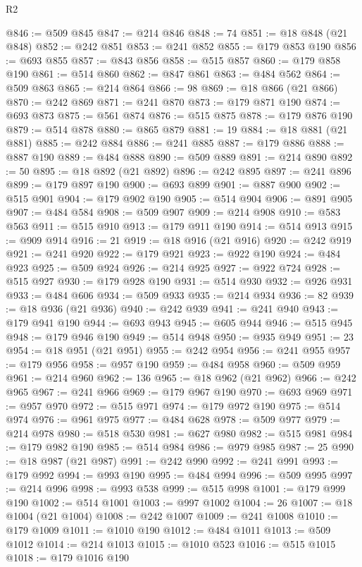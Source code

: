 \begin{lexlean}{R2}
\begin{coremodule}
@846 := @509 @845
@847 := @214 @846
@848 := 74
@851 := @18 @848 (@21 @848)
@852 := @242 @851
@853 := @241 @852
@855 := @179 @853 @190
@856 := @693 @855
@857 := @843 @856
@858 := @515 @857
@860 := @179 @858 @190
@861 := @514 @860
@862 := @847 @861
@863 := @484 @562
@864 := @509 @863
@865 := @214 @864
@866 := 98
@869 := @18 @866 (@21 @866)
@870 := @242 @869
@871 := @241 @870
@873 := @179 @871 @190
@874 := @693 @873
@875 := @561 @874
@876 := @515 @875
@878 := @179 @876 @190
@879 := @514 @878
@880 := @865 @879
@881 := 19
@884 := @18 @881 (@21 @881)
@885 := @242 @884
@886 := @241 @885
@887 := @179 @886
@888 := @887 @190
@889 := @484 @888
@890 := @509 @889
@891 := @214 @890
@892 := 50
@895 := @18 @892 (@21 @892)
@896 := @242 @895
@897 := @241 @896
@899 := @179 @897 @190
@900 := @693 @899
@901 := @887 @900
@902 := @515 @901
@904 := @179 @902 @190
@905 := @514 @904
@906 := @891 @905
@907 := @484 @584
@908 := @509 @907
@909 := @214 @908
@910 := @583 @563
@911 := @515 @910
@913 := @179 @911 @190
@914 := @514 @913
@915 := @909 @914
@916 := 21
@919 := @18 @916 (@21 @916)
@920 := @242 @919
@921 := @241 @920
@922 := @179 @921
@923 := @922 @190
@924 := @484 @923
@925 := @509 @924
@926 := @214 @925
@927 := @922 @724
@928 := @515 @927
@930 := @179 @928 @190
@931 := @514 @930
@932 := @926 @931
@933 := @484 @606
@934 := @509 @933
@935 := @214 @934
@936 := 82
@939 := @18 @936 (@21 @936)
@940 := @242 @939
@941 := @241 @940
@943 := @179 @941 @190
@944 := @693 @943
@945 := @605 @944
@946 := @515 @945
@948 := @179 @946 @190
@949 := @514 @948
@950 := @935 @949
@951 := 23
@954 := @18 @951 (@21 @951)
@955 := @242 @954
@956 := @241 @955
@957 := @179 @956
@958 := @957 @190
@959 := @484 @958
@960 := @509 @959
@961 := @214 @960
@962 := 136
@965 := @18 @962 (@21 @962)
@966 := @242 @965
@967 := @241 @966
@969 := @179 @967 @190
@970 := @693 @969
@971 := @957 @970
@972 := @515 @971
@974 := @179 @972 @190
@975 := @514 @974
@976 := @961 @975
@977 := @484 @628
@978 := @509 @977
@979 := @214 @978
@980 := @518 @530
@981 := @627 @980
@982 := @515 @981
@984 := @179 @982 @190
@985 := @514 @984
@986 := @979 @985
@987 := 25
@990 := @18 @987 (@21 @987)
@991 := @242 @990
@992 := @241 @991
@993 := @179 @992
@994 := @993 @190
@995 := @484 @994
@996 := @509 @995
@997 := @214 @996
@998 := @993 @538
@999 := @515 @998
@1001 := @179 @999 @190
@1002 := @514 @1001
@1003 := @997 @1002
@1004 := 26
@1007 := @18 @1004 (@21 @1004)
@1008 := @242 @1007
@1009 := @241 @1008
@1010 := @179 @1009
@1011 := @1010 @190
@1012 := @484 @1011
@1013 := @509 @1012
@1014 := @214 @1013
@1015 := @1010 @523
@1016 := @515 @1015
@1018 := @179 @1016 @190

\end{coremodule}
\end{lexlean}
